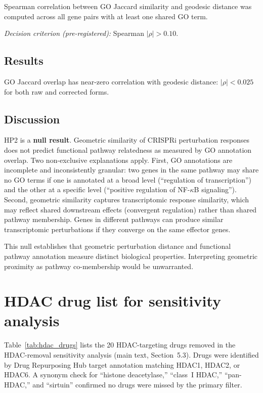 \documentclass[11pt]{article}
\begin{document}
Spearman correlation between GO Jaccard similarity and geodesic distance
was computed across all gene pairs with at least one shared GO term.

\emph{Decision criterion (pre-registered):} Spearman $|\rho| > 0.10$.

\subsection{Results}

GO Jaccard overlap has near-zero correlation with geodesic distance:
$|\rho| < 0.025$ for both raw and corrected forms.

\subsection{Discussion}

HP2 is a \textbf{null result}.  Geometric similarity of CRISPRi
perturbation responses does not predict functional pathway relatedness
as measured by GO annotation overlap.  Two non-exclusive explanations
apply.  First, GO annotations are incomplete and inconsistently granular:
two genes in the same pathway may share no GO terms if one is annotated
at a broad level (``regulation of transcription'') and the other at a
specific level (``positive regulation of NF-$\kappa$B signaling'').
Second, geometric similarity captures transcriptomic response similarity,
which may reflect shared downstream effects (convergent regulation) rather
than shared pathway membership.  Genes in different pathways can produce
similar transcriptomic perturbations if they converge on the same
effector genes.

This null establishes that geometric perturbation distance and functional
pathway annotation measure distinct biological properties.  Interpreting
geometric proximity as pathway co-membership would be unwarranted.

\section{HDAC drug list for sensitivity analysis}
\label{sec:hdac_list}

Table~\ref{tab:hdac_drugs} lists the 20 HDAC-targeting drugs removed in
the HDAC-removal sensitivity analysis (main text, Section~5.3).  Drugs
were identified by Drug Repurposing Hub target annotation matching
HDAC1, HDAC2, or HDAC6.  A synonym check for ``histone deacetylase,''
``class~I HDAC,'' ``pan-HDAC,'' and ``sirtuin'' confirmed no drugs were
missed by the primary filter.
\end{document}
